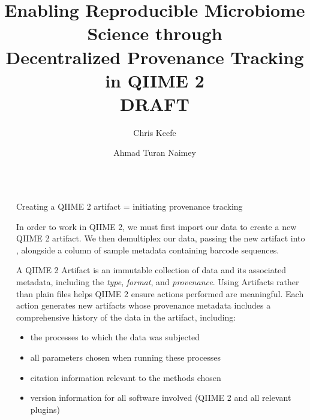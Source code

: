 \documentclass[final]{beamer}
\title{Enabling Reproducible Microbiome Science through \\ Decentralized Provenance Tracking in QIIME 2 \\ DRAFT}
\author{Chris Keefe \inst{1} \and Ahmad Turan Naimey \inst{1}}
\institute[shortinst]{\inst{1} Northern Arizona University; Pathogen and Microbiome Institute}
\newlength{\sepwidth}
\newlength{\colwidth}
\newcommand{\separatorcolumn}{\begin{column}{\sepwidth}\end{column}}
\begin{document}
\begin{frame}[t]
\begin{columns}[t]
\separatorcolumn

\begin{column}{\colwidth}


  \begin{block}{Creating a QIIME 2 artifact = initiating provenance tracking}

   In order to work in QIIME 2, we must first import our data to create a new
   QIIME 2 artifact. We then demultiplex our data, passing the new artifact
   into , alongside a column of sample metadata containing
   barcode sequences. 

   \begin{tcolorbox}
   [width=\textwidth, colframe=blue]
   {A QIIME 2  Artifact is an immutable collection of data and its associated
   metadata, including the \textit{type}, \textit{format}, and \textit{provenance}.
   Using Artifacts rather than plain files helps QIIME 2 ensure actions
   performed are meaningful. Each action generates new artifacts whose
   provenance metadata includes a comprehensive history of the data in the
   artifact, including:}
    \begin{itemize}
      \item {the processes to which the data was subjected}
      \item {all parameters chosen when running these processes}
      \item {citation information relevant to the methods chosen}
      \item {version information for all software involved (QIIME 2 and all relevant plugins)}
    \end{itemize}
    \end{tcolorbox}




\end{block}
\end{column}
\end{columns}
\end{frame}
\end{document}
